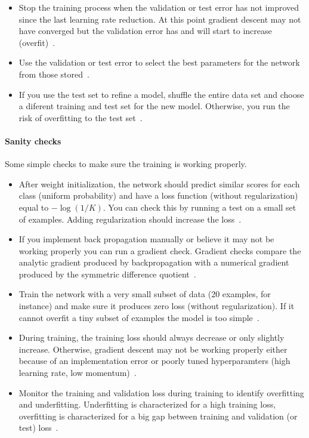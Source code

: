 \begin{itemize}
	\item Stop the training process when the validation or test error has not improved since the last learning rate reduction. At this point gradient descent may not have converged but the validation error has and will start to increase (overfit)~\cite{Bengio2012}.

	\item Use the validation or test error to select the best parameters for the network from those stored~\cite{Bengio2014}. 

	\item If you use the test set to refine a model, shuffle the entire data set and choose a diferent training and test set for the new model. Otherwise, you run the risk of overfitting to the test set~\cite{Ng2014}.
\end{itemize}



\paragraph{Sanity checks}
Some simple checks to make sure the training is working properly.
\begin{itemize}
	\item After weight initialization, the network should predict similar scores for each class (uniform probability) and have a loss function (without regularization) equal to $-\log(1/K)$. You can check this by running a test on a small set of examples. Adding regularization should increase the loss~\cite{Karpathy2015}.

	\item If you implement back propagation manually or believe it may not be working properly you can run a gradient check. Gradient checks compare the analytic gradient produced by backpropagation with a numerical gradient produced by the symmetric difference quotient~\cite{Karpathy2015}.

	\item Train the network with a very small subset of data (20 examples, for instance) and make sure it produces zero loss (without regularization). If it cannot overfit a tiny subset of examples the model is too simple~\cite{Ng2014}.

	\item During training, the training loss should always decrease or only slightly increase. Otherwise, gradient descent may not be working properly either because of an implementation error or poorly tuned hyperparamters (high learning rate, low momentum)~\cite{Karpathy2015}.

	\item Monitor the training and validation loss during training to identify overfitting and underfitting. Underfitting is characterized for a high training loss, overfitting is characterized for a big gap between training and validation (or test) loss~\cite{Ng2014}.
\end{itemize}

